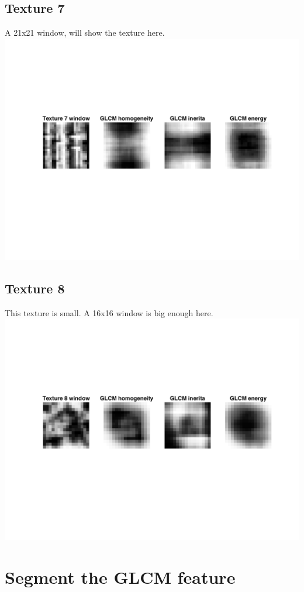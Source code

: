 \documentclass{article}
\begin{document}
\subsection{Texture 7}
A 21x21 window, will show the texture here. \\
\includegraphics[trim=75 140 0 140,clip,totalheight=5cm]{tw7plot.png}
\subsection{Texture 8}
This texture is small. A 16x16 window is big enough here. \\
\includegraphics[trim=75 140 0 140,clip,totalheight=5cm]{tw8plot.png}

\section{Segment the GLCM feature}
\end{document}
